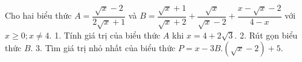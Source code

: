 
\begin{bt}
Cho hai biểu thức $A = \dfrac{\sqrt{x}-2}{2\sqrt{x}+1}$ và $B = \dfrac{\sqrt{x}+1}{\sqrt{x}+2} + \dfrac{\sqrt{x}}{\sqrt{x}-2} + \dfrac{x-\sqrt{x}-2}{4-x}$ với $x \ge 0; x \ne 4$.
1. Tính giá trị của biểu thức $A$ khi $x = 4 + 2\sqrt{3}$.
2. Rút gọn biểu thức $B$.
3. Tìm giá trị nhỏ nhất của biểu thức $P = x - 3B.(\sqrt{x}-2) + 5$.
\loigiai{
}
\end{bt}
